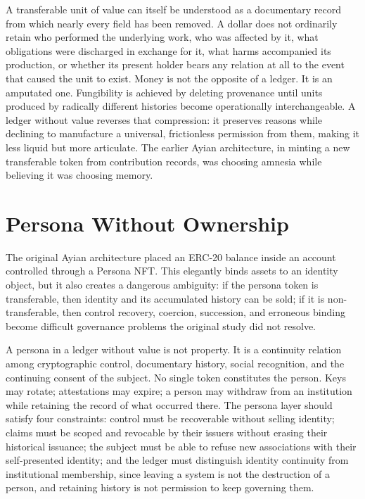 A transferable unit of value can itself be understood as a documentary record from which nearly every field has been removed. A dollar does not ordinarily retain who performed the underlying work, who was affected by it, what obligations were discharged in exchange for it, what harms accompanied its production, or whether its present holder bears any relation at all to the event that caused the unit to exist. Money is not the opposite of a ledger. It is an amputated one. Fungibility is achieved by deleting provenance until units produced by radically different histories become operationally interchangeable. A ledger without value reverses that compression: it preserves reasons while declining to manufacture a universal, frictionless permission from them, making it less liquid but more articulate. The earlier Ayian architecture, in minting a new transferable token from contribution records, was choosing amnesia while believing it was choosing memory.

\section{Persona Without Ownership}

The original Ayian architecture placed an ERC-20 balance inside an account controlled through a Persona NFT. This elegantly binds assets to an identity object, but it also creates a dangerous ambiguity: if the persona token is transferable, then identity and its accumulated history can be sold; if it is non-transferable, then control recovery, coercion, succession, and erroneous binding become difficult governance problems the original study did not resolve.

A persona in a ledger without value is not property. It is a continuity relation among cryptographic control, documentary history, social recognition, and the continuing consent of the subject. No single token constitutes the person. Keys may rotate; attestations may expire; a person may withdraw from an institution while retaining the record of what occurred there. The persona layer should satisfy four constraints: control must be recoverable without selling identity; claims must be scoped and revocable by their issuers without erasing their historical issuance; the subject must be able to refuse new associations with their self-presented identity; and the ledger must distinguish identity continuity from institutional membership, since leaving a system is not the destruction of a person, and retaining history is not permission to keep governing them.


